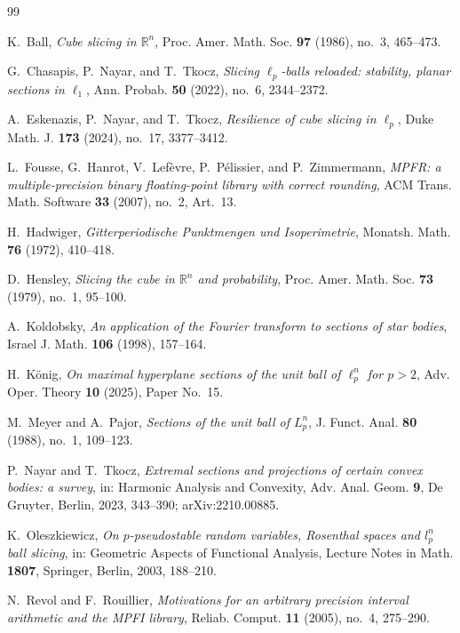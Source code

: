\documentclass[11pt]{amsart}
\theoremstyle{definition}
\theoremstyle{remark}
\numberwithin{equation}{section}
\begin{document}
\begin{thebibliography}{99}

K.~Ball, \emph{Cube slicing in $\mathbb R^n$}, Proc. Amer. Math. Soc. \textbf{97} (1986), no.~3, 465--473.

G.~Chasapis, P.~Nayar, and T.~Tkocz, \emph{Slicing $\ell_p$-balls reloaded: stability, planar sections in $\ell_1$}, Ann. Probab. \textbf{50} (2022), no.~6, 2344--2372.

A.~Eskenazis, P.~Nayar, and T.~Tkocz, \emph{Resilience of cube slicing in $\ell_p$}, Duke Math. J. \textbf{173} (2024), no.~17, 3377--3412.

L.~Fousse, G.~Hanrot, V.~Lef\`evre, P.~P\'elissier, and P.~Zimmermann, \emph{MPFR: a multiple-precision binary floating-point library with correct rounding}, ACM Trans. Math. Software \textbf{33} (2007), no.~2, Art.~13.

H.~Hadwiger, \emph{Gitterperiodische Punktmengen und Isoperimetrie}, Monatsh. Math. \textbf{76} (1972), 410--418.

D.~Hensley, \emph{Slicing the cube in $\mathbb R^n$ and probability}, Proc. Amer. Math. Soc. \textbf{73} (1979), no.~1, 95--100.

A.~Koldobsky, \emph{An application of the Fourier transform to sections of star bodies}, Israel J. Math. \textbf{106} (1998), 157--164.

H.~K\"onig, \emph{On maximal hyperplane sections of the unit ball of $\ell_p^n$ for $p>2$}, Adv. Oper. Theory \textbf{10} (2025), Paper No.~15.

M.~Meyer and A.~Pajor, \emph{Sections of the unit ball of $L_p^n$}, J. Funct. Anal. \textbf{80} (1988), no.~1, 109--123.

P.~Nayar and T.~Tkocz, \emph{Extremal sections and projections of certain convex bodies: a survey}, in: Harmonic Analysis and Convexity, Adv. Anal. Geom. \textbf{9}, De Gruyter, Berlin, 2023, 343--390; arXiv:2210.00885.

K.~Oleszkiewicz, \emph{On $p$-pseudostable random variables, Rosenthal spaces and $l_p^n$ ball slicing}, in: Geometric Aspects of Functional Analysis, Lecture Notes in Math. \textbf{1807}, Springer, Berlin, 2003, 188--210.

N.~Revol and F.~Rouillier, \emph{Motivations for an arbitrary precision interval arithmetic and the MPFI library}, Reliab. Comput. \textbf{11} (2005), no.~4, 275--290.

\end{thebibliography}
\end{document}
